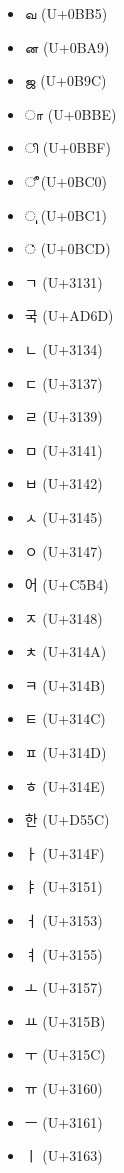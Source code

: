 \documentclass[a4paper]{article}
\begin{document}
\begin{itemize}
    \item {\libertine வ } (U+0BB5)
    \item {\libertine ன } (U+0BA9)
    \item {\libertine ஜ } (U+0B9C)
    \item {\libertine ா} (U+0BBE)
    \item {\libertine  ி } (U+0BBF)
    \item {\libertine  ீ } (U+0BC0)
    \item {\libertine  ு } (U+0BC1)
    \item {\libertine  ் } (U+0BCD)
    \item {\libertine ㄱ } (U+3131)
    \item {\noto 국 } (U+AD6D)
    \item {\noto ㄴ } (U+3134)
    \item {\noto ㄷ } (U+3137)
    \item {\noto ㄹ } (U+3139)
    \item {\noto ㅁ } (U+3141)
    \item {\noto ㅂ } (U+3142)
    \item {\noto ㅅ } (U+3145)
    \item {\noto ㅇ } (U+3147)
    \item {\noto 어 } (U+C5B4)
    \item {\noto ㅈ } (U+3148)
    \item {\noto ㅊ } (U+314A)
    \item {\libertine ㅋ } (U+314B)
    \item {\libertine ㅌ } (U+314C)
    \item {\libertine ㅍ } (U+314D)
    \item {\libertine ㅎ } (U+314E)
    \item {\libertine 한 } (U+D55C)
    \item {\libertine ㅏ } (U+314F)
    \item {\libertine ㅑ } (U+3151)
    \item {\libertine ㅓ } (U+3153)
    \item {\libertine ㅕ } (U+3155)
    \item {\libertine ㅗ } (U+3157)
    \item {\libertine ㅛ } (U+315B)
    \item {\libertine ㅜ } (U+315C)
    \item {\libertine ㅠ } (U+3160)
    \item {\libertine ㅡ } (U+3161)
    \item {\libertine ㅣ } (U+3163)


\end{itemize}
\end{document}

